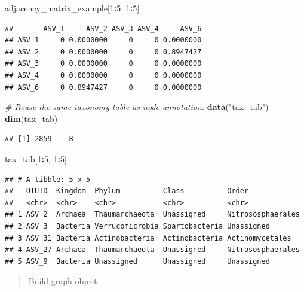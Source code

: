 \documentclass[
]{book}
\newenvironment{Shaded}{\begin{snugshade}}{\end{snugshade}}
\newcommand{\CommentTok}[1]{\textcolor[rgb]{0.56,0.35,0.01}{\textit{#1}}}
\newcommand{\DecValTok}[1]{\textcolor[rgb]{0.00,0.00,0.81}{#1}}
\newcommand{\FunctionTok}[1]{\textcolor[rgb]{0.13,0.29,0.53}{\textbf{#1}}}
\newcommand{\NormalTok}[1]{#1}
\newcommand{\SpecialCharTok}[1]{\textcolor[rgb]{0.81,0.36,0.00}{\textbf{#1}}}
\newcommand{\StringTok}[1]{\textcolor[rgb]{0.31,0.60,0.02}{#1}}
\begin{document}
\begin{Shaded}
\begin{Highlighting}[]
\NormalTok{adjacency\_matrix\_example[}\DecValTok{1}\SpecialCharTok{:}\DecValTok{5}\NormalTok{, }\DecValTok{1}\SpecialCharTok{:}\DecValTok{5}\NormalTok{]}
\end{Highlighting}
\end{Shaded}

\begin{verbatim}
##       ASV_1     ASV_2 ASV_3 ASV_4     ASV_6
## ASV_1     0 0.0000000     0     0 0.0000000
## ASV_2     0 0.0000000     0     0 0.8947427
## ASV_3     0 0.0000000     0     0 0.0000000
## ASV_4     0 0.0000000     0     0 0.0000000
## ASV_6     0 0.8947427     0     0 0.0000000
\end{verbatim}

\begin{Shaded}
\begin{Highlighting}[]
\CommentTok{\# Reuse the same taxonomy table as node annotation.}
\FunctionTok{data}\NormalTok{(}\StringTok{"tax\_tab"}\NormalTok{)}
\FunctionTok{dim}\NormalTok{(tax\_tab)}
\end{Highlighting}
\end{Shaded}

\begin{verbatim}
## [1] 2859    8
\end{verbatim}

\begin{Shaded}
\begin{Highlighting}[]
\NormalTok{tax\_tab[}\DecValTok{1}\SpecialCharTok{:}\DecValTok{5}\NormalTok{, }\DecValTok{1}\SpecialCharTok{:}\DecValTok{5}\NormalTok{]}
\end{Highlighting}
\end{Shaded}

\begin{verbatim}
## # A tibble: 5 x 5
##   OTUID  Kingdom  Phylum          Class          Order            
##   <chr>  <chr>    <chr>           <chr>          <chr>            
## 1 ASV_2  Archaea  Thaumarchaeota  Unassigned     Nitrososphaerales
## 2 ASV_3  Bacteria Verrucomicrobia Spartobacteria Unassigned       
## 3 ASV_31 Bacteria Actinobacteria  Actinobacteria Actinomycetales  
## 4 ASV_27 Archaea  Thaumarchaeota  Unassigned     Nitrososphaerales
## 5 ASV_9  Bacteria Unassigned      Unassigned     Unassigned
\end{verbatim}

\begin{quote}
Build graph object
\end{quote}
\end{document}
